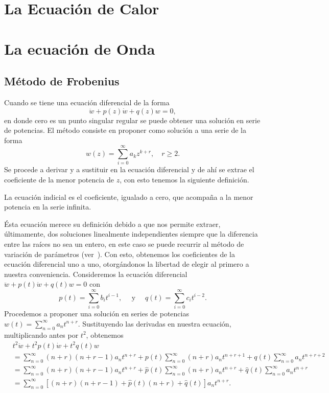 \documentclass[main.tex]{subfiles}
\begin{document}
\section{La Ecuación de Calor}













\section{La ecuación de Onda}
\subsection{Método de Frobenius}
\noindent Cuando se tiene una ecuación diferencial de la forma
\[
  \ddot{w}+p(z)\dot{w}+q(z)w=0,
\]
en donde cero es un punto singular regular se puede obtener una solución en serie de potencias. El método consiste en proponer como solución a una serie de la forma
\[
  w(z)=\sum_{i=0}^{\infty}a_{k}z^{k+r},\quad r\geq2.
\]
Se procede a derivar y a sustituir en la ecuación diferencial y de ahí se extrae el coeficiente de la menor potencia de $z$, con esto tenemos la siguiente definición.
\begin{def.}\label{d1.2} %
  La ecuación indicial es el coeficiente, igualado a cero, que acompaña a la menor potencia en la serie infinita.
\end{def.}
Ésta ecuación merece su definición debido a que nos permite extraer, últimamente, dos soluciones linealmente independientes siempre que la diferencia entre las raíces no sea un entero, en este caso se puede recurrir al método de variación de parámetros (ver~\cite[pp. 137-138]{laura1}). Con esto, obtenemos los coeficientes de la ecuación diferencial uno a uno, otorgándonos la libertad de elegir al primero a nuestra conveniencia.
\noindent Consideremos la ecuación diferencial $\ddot{w}+p(t)\dot{w}+q(t)w=0$ con ~\cite{laura1}
\[
  p(t)=\sum_{i=0}^{\infty}b_{i}t^{i-1},\quad\text{ y }\quad q(t)=\sum_{i=0}^{\infty}c_{i}t^{i-2}.
\]
Procedemos a proponer una solución en series de potencias $w(t)=\sum_{n=0}^{\infty}a_{n}t^{n+r}$. Sustituyendo las derivadas en nuestra ecuación, multiplicando antes por $t^{2}$, obtenemos
\begin{align*}
  &t^{2}\ddot{w}+t^{2}p(t)\dot{w}+t^{2}q(t)w\\
  &=\sum_{n=0}^{\infty}(n+r)(n+r-1)a_{n}t^{n+r}+p(t)\sum_{n=0}^{\infty}(n+r)a_{n}t^{n+r+1}+q(t)\sum_{n=0}^{\infty}a_{n}t^{n+r+2}\\
  &=\sum_{n=0}^{\infty}(n+r)(n+r-1)a_{n}t^{n+r}+\hat{p}(t)\sum_{n=0}^{\infty}(n+r)a_{n}t^{n+r}+\hat{q}(t)\sum_{n=0}^{\infty}a_{n}t^{n+r}\\
  &=\sum_{n=0}^{\infty}\left[(n+r)(n+r-1)+\hat{p}(t)(n+r)+\hat{q}(t)\right]a_{n}t^{n+r}.
\end{align*}
\end{document}
